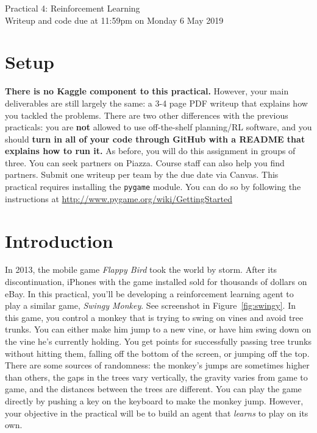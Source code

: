 \documentclass[12pt]{article}
\begin{document}
\begin{center}
{\Large Practical 4: Reinforcement Learning}\\
Writeup and code due at 11:59pm on Monday 6 May 2019\\
\end{center}

\section*{Setup}

{\bf There is no Kaggle component to this practical.}  However, your main deliverables are still largely the same: a 3-4 page PDF writeup that explains how you tackled the problems.  There are two other differences with the previous practicals: you are \textbf{not} allowed to use off-the-shelf planning/RL software, and you should {\bf turn in all of your code through GitHub with a README that explains how to run it.} As before, you will do this assignment in groups of three.  You can seek partners on Piazza.  Course staff can also help you find partners. Submit one writeup per team by the due date via Canvas.  This practical requires installing the \verb|pygame| module. You can do so by following the instructions at \url{http://www.pygame.org/wiki/GettingStarted}


\section*{Introduction}

In 2013, the mobile game \emph{Flappy Bird} took the world by storm.  After its discontinuation, iPhones with the game installed sold for thousands of dollars on eBay.  In this practical, you'll be developing a reinforcement learning agent to play a similar game, \emph{Swingy Monkey}.  See screenshot in Figure~\ref{fig:swingy}.  In this game, you control a monkey that is trying to swing on vines and avoid tree trunks.  You can either make him jump to a new vine, or have him swing down on the vine he's currently holding.  You get points for successfully passing tree trunks without hitting them, falling off the bottom of the screen, or jumping off the top.  There are some sources of randomness: the monkey's jumps are sometimes higher than others, the gaps in the trees vary vertically, the gravity varies from game to game, and the distances between the trees are different.  You can play the game directly by pushing a key on the keyboard to make the monkey jump.  However, your objective in the practical will be to build an agent that \emph{learns} to play on its own. 
\end{document}
